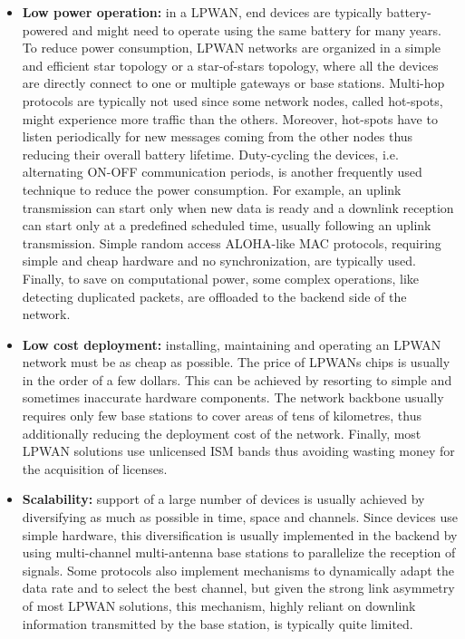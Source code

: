 \begin{itemize}
\item \textbf{Low power operation:} in a \gls{LPWAN}, end devices are typically battery-powered and might need to operate using the same battery for many years. To reduce power consumption, \gls{LPWAN} networks are organized in a simple and efficient star topology or a star-of-stars topology, where all the devices are directly connect to one or multiple gateways or base stations. Multi-hop protocols are typically not used since some network nodes, called hot-spots, might experience more traffic than the others. Moreover, hot-spots have to listen periodically for new messages coming from the other nodes thus reducing their overall battery lifetime. Duty-cycling the devices, i.e. alternating ON-OFF communication periods, is another frequently used technique to reduce the power consumption.
For example, an uplink transmission can start only when new data is ready and a downlink reception can start only at a predefined scheduled time, usually following an uplink transmission. Simple random access ALOHA-like MAC protocols, requiring simple and cheap hardware and no synchronization, are typically used. Finally, to save on computational power, some complex operations, like detecting duplicated packets, are offloaded to the backend side of the network.

\item \textbf{Low cost deployment:} installing, maintaining and operating an \gls{LPWAN} network must be as cheap as possible. The price of \glspl{LPWAN} chips is usually in the order of a few dollars. This can be achieved by resorting to simple and sometimes inaccurate hardware components. The network backbone usually requires only few base stations to cover areas of tens of kilometres, thus additionally reducing the deployment cost of the network. Finally, most \gls{LPWAN} solutions use unlicensed \gls{ISM} bands thus avoiding wasting money for the acquisition of licenses.

\item \textbf{Scalability:} support of a large number of devices is usually achieved by diversifying as much as possible in time, space and channels. Since devices use simple hardware, this diversification is usually implemented in the backend by using multi-channel multi-antenna base stations to parallelize the reception of signals. Some protocols also implement mechanisms to dynamically adapt the data rate and to select the best channel, but given the strong link asymmetry of most \gls{LPWAN} solutions, this mechanism, highly reliant on downlink information transmitted by the base station, is typically quite limited.

\end{itemize}


